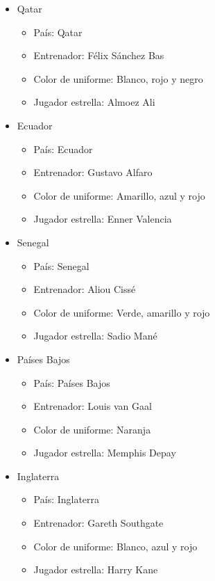 \begin{itemize}
    \item Qatar
        \begin{itemize}
            \item País: Qatar
            \item Entrenador: Félix Sánchez Bas
            \item Color de uniforme: Blanco, rojo y negro
            \item Jugador estrella: Almoez Ali
        \end{itemize}
    \item Ecuador
        \begin{itemize}
            \item País: Ecuador
            \item Entrenador: Gustavo Alfaro
            \item Color de uniforme: Amarillo, azul y rojo
            \item Jugador estrella: Enner Valencia
        \end{itemize}
    \item Senegal
        \begin{itemize}
            \item País: Senegal
            \item Entrenador: Aliou Cissé
            \item Color de uniforme: Verde, amarillo y rojo
            \item Jugador estrella: Sadio Mané
        \end{itemize}
    \item Países Bajos
        \begin{itemize}
            \item País: Países Bajos
            \item Entrenador: Louis van Gaal
            \item Color de uniforme: Naranja
            \item Jugador estrella: Memphis Depay
        \end{itemize}
    \item Inglaterra
        \begin{itemize}
            \item País: Inglaterra
            \item Entrenador: Gareth Southgate
            \item Color de uniforme: Blanco, azul y rojo
            \item Jugador estrella: Harry Kane

\end{itemize}
\end{itemize}
